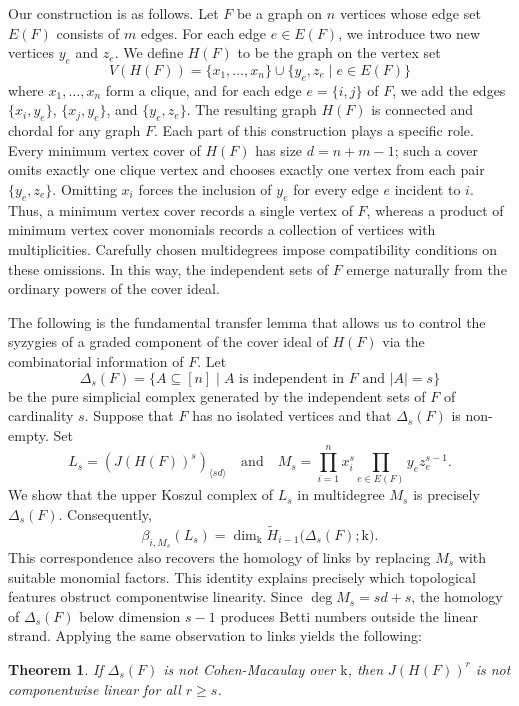 \documentclass[12pt]{amsart}
\newtheorem{theorem}{Theorem}[section]
\theoremstyle{definition}
\theoremstyle{remark}
\begin{document}
Our construction is as follows. Let $F$ be a graph on $n$ vertices whose edge set $E(F)$ consists of $m$ edges. For each edge $e \in E(F)$, we introduce two new vertices $y_e$ and $z_e$. We define $H(F)$ to be the graph on the vertex set
$$V(H(F)) = \{x_1,\ldots,x_n\} \cup \{y_e,z_e \mid e\in E(F)\}$$
where $x_1,\ldots,x_n$ form a clique, and for each edge $e=\{i,j\}$ of $F$, we add the edges $\{x_i,y_e\}$, $\{x_j,y_e\}$, and $\{y_e,z_e\}$. The resulting graph $H(F)$ is connected and chordal for any graph $F$. Each part of this construction plays a specific role. Every minimum vertex cover of $H(F)$ has size $d = n + m - 1$; such a cover omits exactly one clique vertex and chooses exactly one vertex from each pair $\{y_e,z_e\}$. Omitting $x_i$ forces the inclusion of $y_e$ for every edge $e$ incident to $i$. Thus, a minimum vertex cover records a single vertex of $F$, whereas a product of minimum vertex cover monomials records a collection of vertices with multiplicities. Carefully chosen multidegrees impose compatibility conditions on these omissions. In this way, the independent sets of $F$ emerge naturally from the ordinary powers of the cover ideal.

The following is the fundamental transfer lemma that allows us to control the syzygies of a graded component of the cover ideal of $H(F)$ via the combinatorial information of $F$. Let 
\[
\Delta_s(F) = \{ A \subseteq [n] \mid A \text{ is independent in } F \text{ and } |A| = s \}
\]
be the pure simplicial complex generated by the independent sets of $F$ of cardinality $s$. Suppose that $F$ has no isolated vertices and that $\Delta_s(F)$ is non-empty. Set 
\[
L_s = (J(H(F))^s)_{\langle sd \rangle} \quad \text{and} \quad M_s = \prod_{i=1}^n x_i^s \prod_{e \in E(F)} y_e z_e^{s-1}.
\]
We show that the upper Koszul complex of $L_s$ in multidegree $M_s$ is precisely $\Delta_s(F)$. Consequently, 
$$\beta_{i,M_s}(L_s) = \dim_{\mathrm{k}} \widetilde{H}_{i-1}\bigl(\Delta_s(F); \mathrm{k}\bigr).$$
This correspondence also recovers the homology of links by replacing $M_s$ with suitable monomial factors. This identity explains precisely which topological features obstruct componentwise linearity. Since $\deg M_s = sd + s$, the homology of $\Delta_s(F)$ below dimension $s-1$ produces Betti numbers outside the linear strand. Applying the same observation to links yields the following:

\begin{theorem}\label{thm_CM}
If $\Delta_s(F)$ is not Cohen-Macaulay over $\mathrm{k}$, then $J(H(F))^r$ is not componentwise linear for all $r \ge s$.
\end{theorem}
\end{document}
